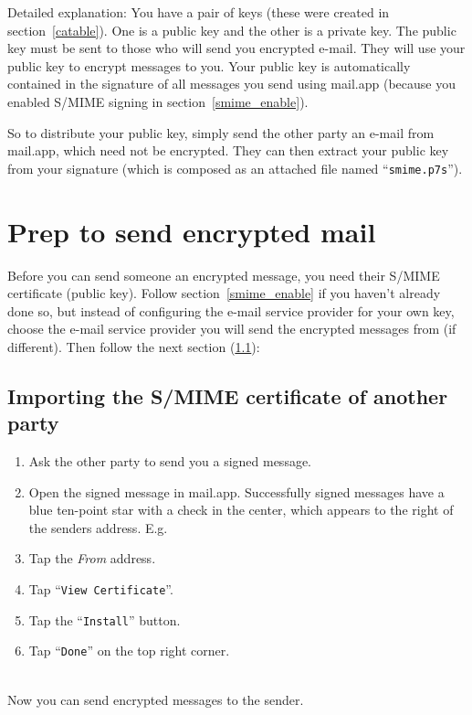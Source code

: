 \documentclass[pdftex,12pt,titlepage=false]{scrartcl}
\begin{document}
Detailed explanation: You have a pair of keys (these were created in
section~\ref{catable}).  One is a public key and the other is a
private key.  The public key must be sent to those who will send you
encrypted e-mail.  They will use your public key to encrypt messages
to you.  Your public key is automatically contained in the signature
of all messages you send using mail.app (because you enabled S/MIME
signing in section~\ref{smime_enable}).

So to distribute your public key, simply send the other party an
e-mail from mail.app, which need not be encrypted.  They can then
extract your public key from your signature (which is composed as an
attached file named ``\verb|smime.p7s|'').

\section{Prep to send encrypted mail%
}
Before you can send someone an encrypted message, you need their
S/MIME certificate (public key).  Follow section~\ref{smime_enable} if
you haven't already done so, but instead of configuring the e-mail
service provider for your own key, choose the e-mail service provider
you will send the encrypted messages from (if different).  Then follow
the next section (\ref{import_cert}):

\subsection{Importing the S/MIME certificate of another
  party}\label{import_cert}
\begin{minipage}{\textwidth}
  \begin{multicols}{2}
    \begin{enumerate}
    \item Ask the other party to send you a signed message.
    \item %
          Open the signed message in mail.app.  Successfully signed
          messages have a blue ten-point star with a check in the center,
          which appears to the right of the senders
          address. E.g. 
          
    \item Tap the \emph{From} address.
    \item Tap ``\verb|View Certificate|''.
    \item Tap the ``\verb|Install|'' button.
    \item Tap ``\verb|Done|'' on the top right corner.
    \end{enumerate}
  \end{multicols}
\end{minipage}\\[1em]

Now you can send encrypted messages to the sender.
\end{document}
